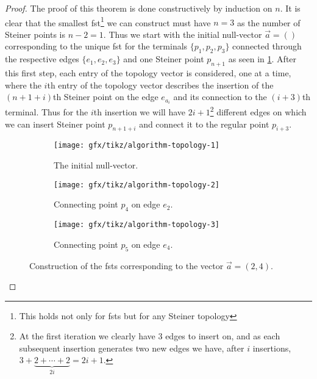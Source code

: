 \begin{proof}
  The proof of this theorem is done constructively by induction on $n$. It is
  clear that the smallest \ac{fst}\footnote{This holds not only for \acp{fst}
    but for any Steiner topology} we can construct must have $n = 3$ as the
  number of Steiner points is $n - 2 = 1$. Thus we start with the initial
  null-vector $\vec{a} = ()$ corresponding to the unique \ac{fst} for the
  terminals $\{p_1, p_2, p_3\}$ connected through the respective edges $\{e_1,
  e_2, e_3\}$ and one Steiner point $p_{n+1}$ as seen in
  \cref{fig:algorithm-topology-1}. After this first step, each entry of the
  topology vector is considered, one at a time, where the $i$th entry of the
  topology vector describes the insertion of the $(n+1+i)$th Steiner point on
  the edge $e_{a_{i}}$ and its connection to the $(i+3)$th terminal. Thus for
  the $i$th insertion we will have $2i+1$\footnote{At the first iteration we
    clearly have $3$ edges to insert on, and as each subsequent insertion
    generates two new edges we have, after $i$ insertions, $3 + \underbrace{2 +
      \cdots + 2}_{2 i} = 2 i + 1$.} different edges on which we can insert
  Steiner point $p_{n + 1 + i}$ and connect it to the regular point $p_{i+3}$.
  
  \begin{figure}[htbp] \centering
    \begin{subfigure}[t]{0.267\textwidth}
      \texttt{[image: gfx/tikz/algorithm-topology-1]}
      \caption{The initial null-vector.\label{fig:algorithm-topology-1}}
    \end{subfigure}\hspace{1em}%
    \begin{subfigure}[t]{0.267\textwidth}
      \texttt{[image: gfx/tikz/algorithm-topology-2]}
      \caption{Connecting point $p_4$ on edge $e_2$.\label{fig:algorithm-topology-2}}
    \end{subfigure}\hspace{1em}%
    \begin{subfigure}[t]{0.267\textwidth}
      \texttt{[image: gfx/tikz/algorithm-topology-3]}
      \caption{Connecting point $p_5$ on edge $e_4$.\label{fig:algorithm-topology-3}}
    \end{subfigure}
    \caption[Construction of FSTs]{Construction of the \acsp{fst} corresponding
      to the vector $\vec{a} = (2, 4)$.\label{fig:algorithm-topologies}}
  \end{figure}
\end{proof}

